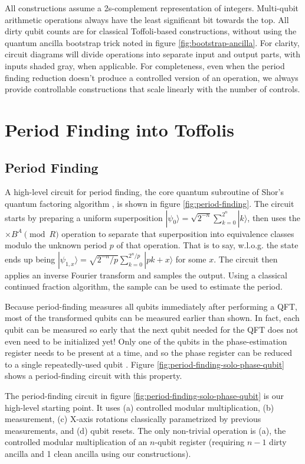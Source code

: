 \documentclass[twocolumn]{article}
\begin{document}
All constructions assume a 2s-complement representation of integers.
Multi-qubit arithmetic operations always have the least significant bit towards the top.
All dirty qubit counts are for classical Toffoli-based constructions, without using the quantum ancilla bootstrap trick noted in figure \ref{fig:bootstrap-ancilla}.
For clarity, circuit diagrams will divide operations into separate input and output parts, with inputs shaded gray, when applicable.
For completeness, even when the period finding reduction doesn't produce a controlled version of an operation, we always provide controllable constructions that scale linearly with the number of controls.


\section{Period Finding into Toffolis} \label{sec:construct}

\subsection{Period Finding}

A high-level circuit for period finding, the core quantum subroutine of Shor's quantum factoring algorithm \cite{Shor1999}, is shown in figure \ref{fig:period-finding}.
The circuit starts by preparing a uniform superposition $|\psi_0\rangle = \sqrt{2^{-n}} \sum_{k=0}^{2^n} |k\rangle$, then uses the $\times B^A {\pmod R}$ operation to separate that superposition into equivalence classes modulo the unknown period $p$ of that operation.
That is to say, w.l.o.g. the state ends up being $|\psi_{1,x}\rangle = \sqrt{2^{-n}/p} \sum_{k=0}^{2^n/p} |pk + x \rangle$ for some $x$.
The circuit then applies an inverse Fourier transform and samples the output.
Using a classical continued fraction algorithm, the sample can be used to estimate the period.

Because period-finding measures all qubits immediately after performing a QFT, most of the transformed qubits can be measured earlier than shown.
In fact, each qubit can be measured so early that the next qubit needed for the QFT does not even need to be initialized yet!
Only one of the qubits in the phase-estimation register needs to be present at a time, and so the phase register can be reduced to a single repeatedly-used qubit \cite{beauregard2003}.
Figure \ref{fig:period-finding-solo-phase-qubit} shows a period-finding circuit with this property.

The period-finding circuit in figure \ref{fig:period-finding-solo-phase-qubit} is our high-level starting point.
It uses (a) controlled modular multiplication, (b) measurement, (c) X-axis rotations classically parametrized by previous measurements, and (d) qubit resets.
The only non-trivial operation is (a), the controlled modular multiplication of an $n$-qubit register (requiring $n-1$ dirty ancilla and 1 clean ancilla using our constructions).
\end{document}

